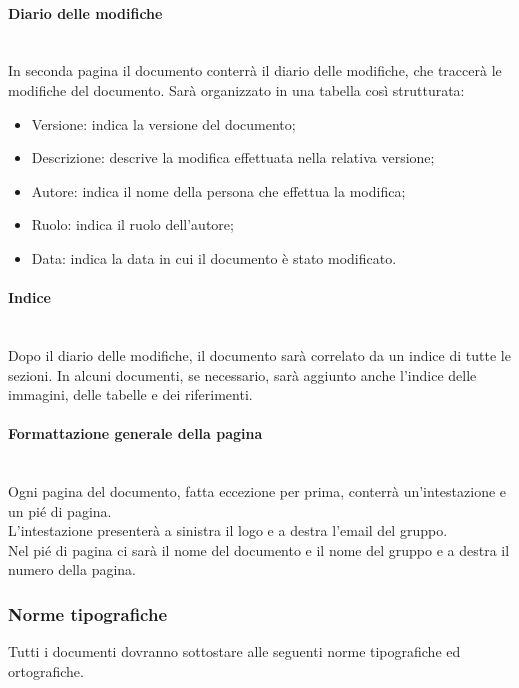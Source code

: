 	\paragraph{Diario delle modifiche}
	~\\In seconda pagina il documento conterrà il diario delle modifiche, che traccerà le modifiche del documento. Sarà organizzato in una tabella così strutturata:
	\begin{itemize}
		\item Versione:
		indica la versione del documento;
		\item Descrizione:
		descrive la modifica effettuata nella relativa versione;
		\item Autore:
		indica il nome della persona che effettua la modifica;
		\item Ruolo:
		indica il ruolo dell'autore;
		\item Data:
		indica la data in cui il documento è stato modificato.
	\end{itemize}
	\paragraph{Indice}
	~\\Dopo il diario delle modifiche, il documento sarà correlato da un indice di tutte le sezioni. In alcuni documenti, se necessario, sarà aggiunto anche l'indice delle immagini, delle tabelle e dei riferimenti.
	\paragraph{Formattazione generale della pagina}
	~\\Ogni pagina del documento, fatta eccezione per prima, conterrà un'intestazione e un pié di pagina.
	\\L'intestazione presenterà a sinistra il logo e a destra l'email del gruppo.
	\\Nel pié di pagina ci sarà il nome del documento e il nome del gruppo e a destra il numero della pagina.
	\subsubsection{Norme tipografiche}
	Tutti i documenti dovranno sottostare alle seguenti norme tipografiche ed ortografiche.
